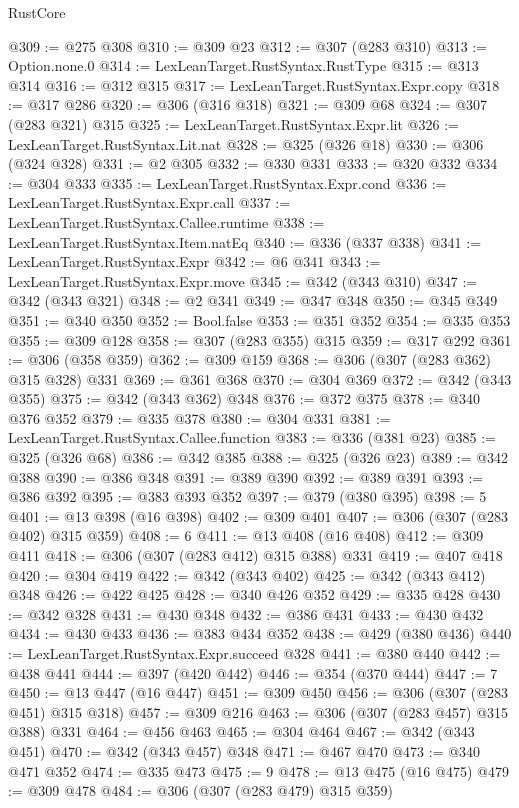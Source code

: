 \begin{lexlean}{RustCore}
\begin{coremodule}
@309 := @275 @308
@310 := @309 @23
@312 := @307 (@283 @310)
@313 := Option.none.{0}
@314 := LexLeanTarget.RustSyntax.RustType
@315 := @313 @314
@316 := @312 @315
@317 := LexLeanTarget.RustSyntax.Expr.copy
@318 := @317 @286
@320 := @306 (@316 @318)
@321 := @309 @68
@324 := @307 (@283 @321) @315
@325 := LexLeanTarget.RustSyntax.Expr.lit
@326 := LexLeanTarget.RustSyntax.Lit.nat
@328 := @325 (@326 @18)
@330 := @306 (@324 @328)
@331 := @2 @305
@332 := @330 @331
@333 := @320 @332
@334 := @304 @333
@335 := LexLeanTarget.RustSyntax.Expr.cond
@336 := LexLeanTarget.RustSyntax.Expr.call
@337 := LexLeanTarget.RustSyntax.Callee.runtime
@338 := LexLeanTarget.RustSyntax.Item.natEq
@340 := @336 (@337 @338)
@341 := LexLeanTarget.RustSyntax.Expr
@342 := @6 @341
@343 := LexLeanTarget.RustSyntax.Expr.move
@345 := @342 (@343 @310)
@347 := @342 (@343 @321)
@348 := @2 @341
@349 := @347 @348
@350 := @345 @349
@351 := @340 @350
@352 := Bool.false
@353 := @351 @352
@354 := @335 @353
@355 := @309 @128
@358 := @307 (@283 @355) @315
@359 := @317 @292
@361 := @306 (@358 @359)
@362 := @309 @159
@368 := @306 (@307 (@283 @362) @315 @328) @331
@369 := @361 @368
@370 := @304 @369
@372 := @342 (@343 @355)
@375 := @342 (@343 @362) @348
@376 := @372 @375
@378 := @340 @376 @352
@379 := @335 @378
@380 := @304 @331
@381 := LexLeanTarget.RustSyntax.Callee.function
@383 := @336 (@381 @23)
@385 := @325 (@326 @68)
@386 := @342 @385
@388 := @325 (@326 @23)
@389 := @342 @388
@390 := @386 @348
@391 := @389 @390
@392 := @389 @391
@393 := @386 @392
@395 := @383 @393 @352
@397 := @379 (@380 @395)
@398 := 5
@401 := @13 @398 (@16 @398)
@402 := @309 @401
@407 := @306 (@307 (@283 @402) @315 @359)
@408 := 6
@411 := @13 @408 (@16 @408)
@412 := @309 @411
@418 := @306 (@307 (@283 @412) @315 @388) @331
@419 := @407 @418
@420 := @304 @419
@422 := @342 (@343 @402)
@425 := @342 (@343 @412) @348
@426 := @422 @425
@428 := @340 @426 @352
@429 := @335 @428
@430 := @342 @328
@431 := @430 @348
@432 := @386 @431
@433 := @430 @432
@434 := @430 @433
@436 := @383 @434 @352
@438 := @429 (@380 @436)
@440 := LexLeanTarget.RustSyntax.Expr.succeed @328
@441 := @380 @440
@442 := @438 @441
@444 := @397 (@420 @442)
@446 := @354 (@370 @444)
@447 := 7
@450 := @13 @447 (@16 @447)
@451 := @309 @450
@456 := @306 (@307 (@283 @451) @315 @318)
@457 := @309 @216
@463 := @306 (@307 (@283 @457) @315 @388) @331
@464 := @456 @463
@465 := @304 @464
@467 := @342 (@343 @451)
@470 := @342 (@343 @457) @348
@471 := @467 @470
@473 := @340 @471 @352
@474 := @335 @473
@475 := 9
@478 := @13 @475 (@16 @475)
@479 := @309 @478
@484 := @306 (@307 (@283 @479) @315 @359)

\end{coremodule}
\end{lexlean}
